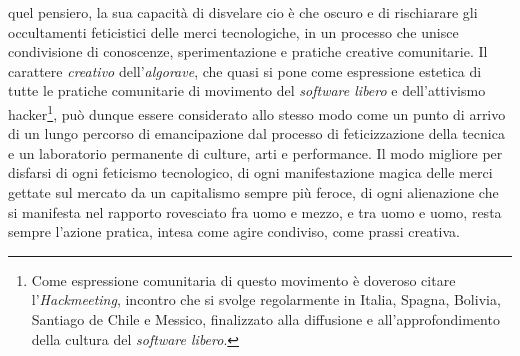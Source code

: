 \documentclass[a4paper,12pt]{scrartcl}
\begin{document}
quel pensiero, la sua capacità di disvelare cio è che oscuro e di rischiarare gli occultamenti feticistici delle merci tecnologiche, in un processo che unisce condivisione di conoscenze, sperimentazione e pratiche creative comunitarie. Il carattere \emph{creativo} dell'\textit{algorave}, che quasi si pone come espressione estetica di tutte le pratiche comunitarie di movimento del \emph{software libero} e dell'attivismo hacker\footnote{Come espressione comunitaria di questo movimento è doveroso citare l'\emph{Hackmeeting}, incontro che si svolge regolarmente in Italia, Spagna, Bolivia, Santiago de Chile e Messico, finalizzato alla diffusione e all'approfondimento della cultura del \emph{software libero}.}, può dunque essere considerato allo stesso modo come un punto di arrivo di un lungo percorso di emancipazione dal processo di feticizzazione della tecnica e un laboratorio permanente di culture, arti e performance. Il modo migliore per disfarsi di ogni feticismo tecnologico, di ogni manifestazione magica delle merci gettate sul mercato da un capitalismo sempre più feroce, di ogni alienazione che si manifesta nel rapporto rovesciato fra uomo e mezzo, e tra uomo e uomo, resta sempre l'azione pratica, intesa come agire condiviso, come prassi creativa.
\end{document}
